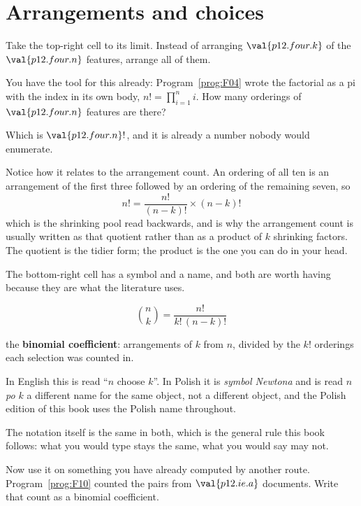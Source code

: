 \section{Arrangements and choices}
\label{sec:P12-choices}

\begin{fr}
Take the top-right cell to its limit. Instead of arranging
$\val{p12.four.k}$ of the $\val{p12.four.n}$ features, arrange all of them.

You have the tool for this already: Program~\ref{prog:F04} wrote the factorial
as a pi with the index in its own body, $n! = \prod_{i=1}^{n} i$. How many
orderings of $\val{p12.four.n}$ features are there?
\nextframe
\end{fr}

\begin{fr}
Which is $\val{p12.four.n}!$, and it is already a number nobody would
enumerate.

Notice how it relates to the arrangement count. An ordering of all ten is an
arrangement of the first three followed by an ordering of the remaining seven,
so
\[ n! = \frac{n!}{(n-k)!} \times (n-k)! \]
which is the shrinking pool read backwards, and is why the arrangement count
is usually written as that quotient rather than as a product of $k$ shrinking
factors. The quotient is the tidier form; the product is the one you can do in
your head.
\end{fr}

\begin{fr}
The bottom-right cell has a symbol and a name, and both are worth having
because they are what the literature uses.

\[ \binom{n}{k} = \frac{n!}{k!\,(n-k)!} \]

the \textbf{binomial coefficient}: arrangements of $k$ from $n$, divided by
the $k!$ orderings each selection was counted in.

\begin{notationbox}
In English this is read \enquote{$n$ choose $k$}. In Polish it is
\emph{symbol Newtona} and is read \emph{$n$ po $k$} \dash{} a different name
for the same object, not a different object, and the Polish edition of this
book uses the Polish name throughout.

The notation itself is the same in both, which is the general rule this book
follows: what you would type stays the same, what you would say may not.
\end{notationbox}

Now use it on something you have already computed by another route.
Program~\ref{prog:F10} counted the pairs from $\val{p12.ie.a}$ documents. Write
that count as a binomial coefficient.
\dotline
\nextframe
\end{fr}

